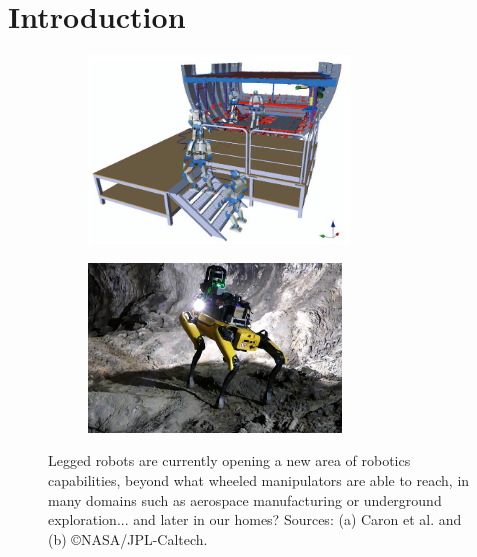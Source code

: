 
\chapter{Introduction}
\label{chapter:intro}
\minitoc
\bigskip


\begin{figure}[h]
    \centering
    \captionsetup[subfigure]{justification=centering}
    \begin{subfigure}[t]{0.48\linewidth}
        \includegraphics[width=\textwidth,height=5cm]{Figures/Chapter_INTRO/caron_image_plane.png}
        \caption{}
        \label{fig:intro_0}
    \end{subfigure}
    \begin{subfigure}[t]{0.48\linewidth}
        \includegraphics[width=\textwidth,height=4.5cm]{Figures/Chapter_INTRO/darpa_nasa.jpg}
        \caption{}
        \label{fig:intro_1}
    \end{subfigure}
    \caption{Legged robots are currently opening a new area of robotics capabilities, beyond what wheeled manipulators are able to reach, in many domains such as aerospace manufacturing or underground exploration... and later in our homes? Sources: (a) Caron et al. \cite{caron_plane_2016} and (b) \copyright NASA/JPL-Caltech.}
    \label{fig:intro}
\end{figure}

